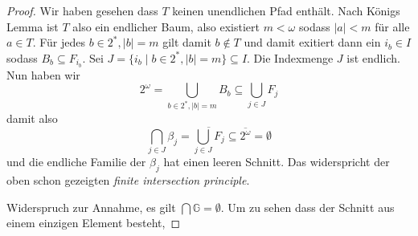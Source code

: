 \documentclass[nofonts]{uebung}
\begin{document}
\begin{proof}
    Wir haben gesehen dass $T$ keinen unendlichen Pfad enthält. Nach Königs Lemma ist $T$ also ein endlicher Baum, also existiert $m<\omega$ sodass $|a|<m$ für alle $a\in T$.
    Für jedes $b\in 2^*, |b|=m$ gilt damit $b\not\in T$ und damit exitiert dann ein $i_b\in I$ sodass $B_b\subseteq F_{i_b}$.
    Sei $J=\{ i_b \mid b\in 2^*, |b|=m\}\subseteq I$. Die Indexmenge $J$ ist endlich.
    Nun haben wir
    \[ 2^\omega = \bigcup_{b\in 2^*, |b|=m} B_b \subseteq \bigcup_{j\in J} F_j \]
    damit also
    \[ \bigcap_{j\in J} \beta_j = \overline{\bigcup_{j\in J} F_j} \subseteq \overline{2^\omega} = \emptyset \]
    und die endliche Familie der $\beta_j$ hat einen leeren Schnitt.
    Das widerspricht der oben schon gezeigten \emph{finite intersection principle}.

    Widerspruch zur Annahme, es gilt $\bigcap \mathbb G  = \emptyset$.
    Um zu sehen dass der Schnitt aus einem einzigen Element besteht, 
\end{proof}
\end{document}
